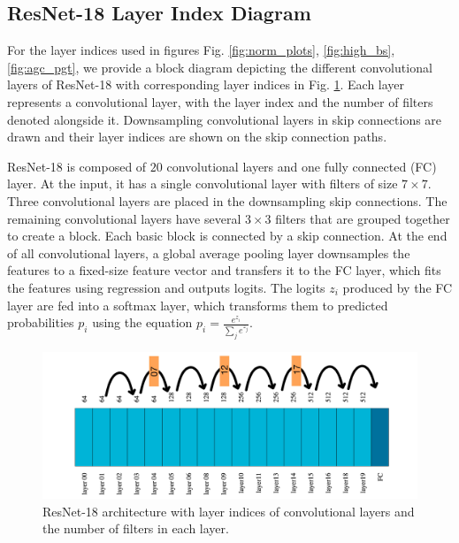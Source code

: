 \documentclass[times,sort&compress]{elsarticle}
\begin{document}
\newpage \subsection{ResNet-18 Layer Index Diagram}

For the layer indices used in figures Fig. \ref{fig:norm_plots}, \ref{fig:high_bs},
\ref{fig:agc_pgt}, we provide a block diagram depicting the different convolutional
layers of ResNet-18 with corresponding layer indices in Fig. \ref{fig:resnet18}. Each
layer represents a convolutional layer, with the layer index and the number of filters
denoted alongside it. Downsampling convolutional layers in skip connections are drawn
and their layer indices are shown on the skip connection paths.


ResNet-18 is composed of $20$ convolutional layers and one fully connected (FC) layer.
At the input, it has a single convolutional layer with filters of size $7\times 7$.
Three convolutional layers are placed in the downsampling skip connections. The
remaining convolutional layers have several $3\times 3$ filters that are grouped
together to create a block. Each basic block is connected by a skip connection. At the
end of all convolutional layers, a global average pooling layer downsamples the features
to a fixed-size feature vector and transfers it to the FC layer, which fits the features
using regression and outputs logits. The logits $z_i$ produced by the FC layer are fed
into a softmax layer, which transforms them to predicted probabilities $p_i$ using the
equation $p_i=\frac {e^{z_i}}{\sum _j e^{z_j}}$.


\begin{figure}[h] \centering \includegraphics[width=0.96\columnwidth]{drawing} \caption{
ResNet-18 architecture with layer indices of convolutional layers and the number of
filters in each layer. } \label{fig:resnet18} \end{figure}
\end{document}
